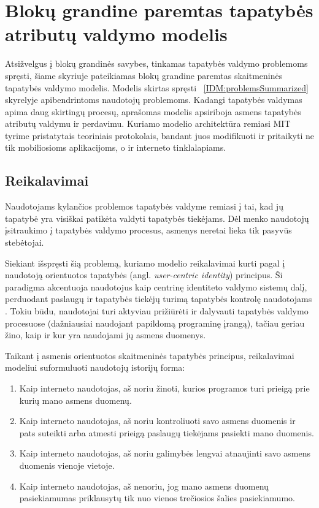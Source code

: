 \section{Blokų grandine paremtas tapatybės atributų valdymo modelis}

Atsižvelgus į blokų grandinės savybes, tinkamas tapatybės valdymo problemoms spręsti, šiame skyriuje pateikiamas
blokų grandine paremtas skaitmeninės tapatybės valdymo modelis. Modelis skirtas spręsti ~\ref{IDM:problemsSummarized} skyrelyje
apibendrintoms naudotojų problemoms. Kadangi tapatybės valdymas apima
daug skirtingų procesų, aprašomas modelis apsiriboja asmens tapatybės atributų valdymu ir perdavimu. Kuriamo modelio architektūra 
remiasi MIT tyrime \cite{MITPaper} pristatytais teoriniais protokolais, bandant juos modifikuoti ir pritaikyti
ne tik mobiliosioms aplikacijoms, o ir interneto tinklalapiams.

\subsection{Reikalavimai}

Naudotojams kylančios problemos tapatybės valdyme remiasi į tai, kad jų tapatybė yra
visiškai patikėta valdyti tapatybės tiekėjams. Dėl menko naudotojų įsitraukimo į tapatybės valdymo
procesus, asmenys neretai lieka tik pasyvūs stebėtojai.

Siekiant išspręsti šią problemą, kuriamo modelio reikalavimai kurti pagal į naudotoją orientuotos tapatybės
(angl. \textit{user-centric identity}) principus. Ši paradigma akcentuoja naudotojus kaip centrinę
identiteto valdymo sistemų dalį, perduodant paslaugų ir tapatybės tiekėjų turimą tapatybės kontrolę
naudotojams \cite{Cao2010}. Tokiu būdu, naudotojai turi aktyviau prižiūrėti ir dalyvauti tapatybės
valdymo procesuose (dažniausiai naudojant papildomą programinę įrangą),
tačiau geriau žino, kaip ir kur yra naudojami jų asmens duomenys.

Taikant į asmenis orientuotos skaitmeninės tapatybės principus, reikalavimai modeliui suformuluoti naudotojų istorijų forma:

\begin{enumerate}
    \item Kaip interneto naudotojas, aš noriu žinoti, kurios programos turi prieigą prie kurių mano asmens duomenų.
    \item Kaip interneto naudotojas, aš noriu kontroliuoti savo asmens duomenis ir pats suteikti arba atmesti prieigą paslaugų tiekėjams pasiekti mano duomenis.
    \item Kaip interneto naudotojas, aš noriu galimybės lengvai atnaujinti savo asmens duomenis vienoje vietoje.
    \item Kaip interneto naudotojas, aš nenoriu, jog mano asmens duomenų pasiekiamumas priklausytų tik nuo vienos trečiosios šalies pasiekiamumo.
\end{enumerate}

